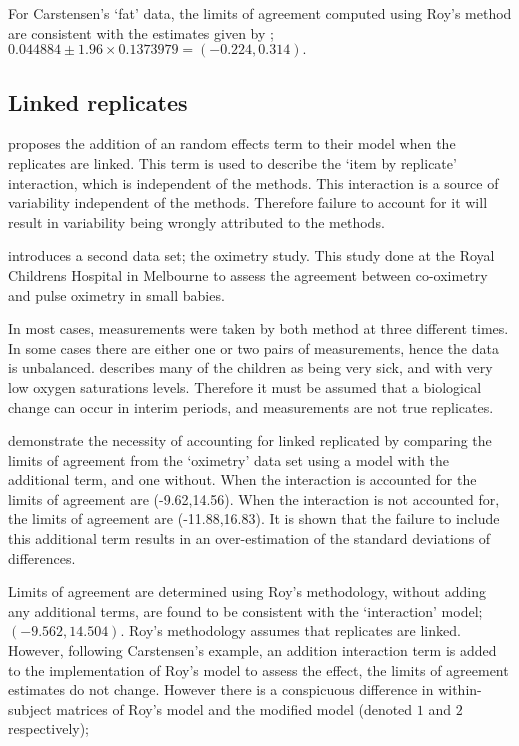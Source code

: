 \documentclass[12pt, a4paper]{report}
\theoremstyle{plain}
\theoremstyle{definition}
\theoremstyle{remark}
\begin{document}
For Carstensen's `fat' data, the limits of agreement computed using Roy's
method are consistent with the estimates given by \citet{BXC2008}; $0.044884  \pm 1.96 \times  0.1373979 = (-0.224,  0.314).$

\subsection{Linked replicates}

\citet{BXC2008} proposes the addition of an random effects term to their model when the replicates are linked. This term is used to describe the `item by replicate' interaction, which is independent of the methods. This interaction is a source of variability independent of the methods. Therefore failure to account for it will result in variability being wrongly attributed to the methods.

\citet{BXC2008} introduces a second data set; the oximetry study. This study done at the Royal Childrens Hospital in
Melbourne to assess the agreement between co-oximetry and pulse oximetry in small babies.

In most cases, measurements were taken by both method at three different times. In some cases there are either one or two pairs of measurements, hence the data is unbalanced. \citet{BXC2008} describes many of the children as being very sick, and with very low oxygen saturations levels. Therefore it must be assumed that a biological change can occur in interim periods, and measurements are not true replicates.

\citet{BXC2008} demonstrate the necessity of accounting for linked replicated by comparing the limits of agreement from the `oximetry' data set using a model with the additional term, and one without. When the interaction is accounted for the limits of agreement are (-9.62,14.56). When the interaction is not accounted for, the limits of agreement are (-11.88,16.83). It is shown that the failure to include this additional term results in an over-estimation of the standard deviations of differences.

Limits of agreement are determined using Roy's methodology, without adding any additional terms, are found to be consistent with the `interaction' model; $(-9.562, 14.504 )$. Roy's methodology assumes that replicates are linked. However, following Carstensen's example, an addition interaction term is added to the implementation of Roy's model to assess the effect, the limits of agreement estimates do not change. However there is a conspicuous difference in within-subject matrices of Roy's model and the modified model (denoted $1$ and $2$ respectively);
\end{document}
